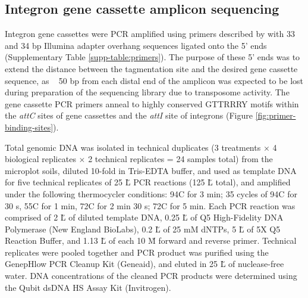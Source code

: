 \subsection{Integron gene cassette amplicon sequencing}

Integron gene cassettes were PCR amplified using primers described by \cite{Stokes.2001} with 33 and 34 bp Illumina adapter overhang sequences ligated onto the 5’ ends (Supplementary Table \ref{supp-table:primers}).
The purpose of these 5’ ends was to extend the distance between the tagmentation site and the desired gene cassette sequence, as ~ 50 bp from each distal end of the amplicon was expected to be lost during preparation of the sequencing library due to transposome activity.
The gene cassette PCR primers anneal to highly conserved GTTRRRY motifs within the \textit{attC} sites of gene cassettes and the \textit{attI} site of integrons (Figure \ref{fig:primer-binding-sites}).

Total genomic DNA was isolated in technical duplicates (3 treatments $\times$ 4 biological replicates $\times$ 2 technical replicates = 24 samples total) from the microplot soils, diluted 10-fold in Tris-EDTA buffer, and used as template DNA for five technical replicates of 25 \u L PCR reactions (125 \u L total), and amplified under the following thermocycler conditions:
94\degree C for 3 min; 35 cycles of 94\degree C for 30 s, 55\degree C for 1 min, 72\degree C for 2 min 30 s; 72\degree C for 5 min.
Each PCR reaction was comprised of 2 \u L of diluted template DNA, 0.25 \u L of Q5\textsuperscript{\textregistered{}} High-Fidelity DNA Polymerase (New England BioLabs), 0.2 \u L of 25 mM dNTPs, 5 \u L of 5X Q5\textsuperscript{\textregistered{}} Reaction Buffer, and 1.13 \u L of each 10 \u M forward and reverse primer.
Technical replicates were pooled together and PCR product was purified using the GenepHlow PCR Cleanup Kit (Geneaid), and eluted in 25 \u L of nuclease-free water.
DNA concentrations of the cleaned PCR products were determined using the Qubit\textsuperscript{\texttrademark{}} dsDNA HS Assay Kit (Invitrogen).

